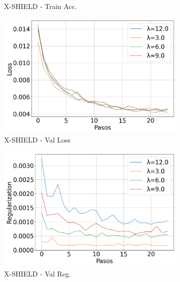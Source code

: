 \begin{figure}[H]
\begin{subfigure}[b]{0.3\textwidth}
        \caption{X-SHIELD - Train Acc.}
    \end{subfigure}

    \vspace{0.5em}

    \begin{subfigure}[b]{0.3\textwidth}
        \includegraphics[width=\linewidth]{images/Val_Loss_evolucion_xshield.png}
        \caption{X-SHIELD - Val Loss}
    \end{subfigure}
    \hfill
    \begin{subfigure}[b]{0.3\textwidth}
        \includegraphics[width=\linewidth]{images/Val_Regularization_evolucion_xshield.png}
        \caption{X-SHIELD - Val Reg.}
    \end{subfigure}
    \hfill
    \begin{subfigure}[b]{0.3\textwidth}

\end{subfigure}
\end{figure}
